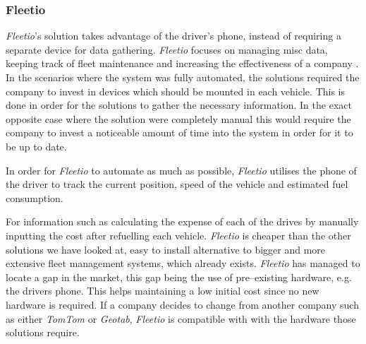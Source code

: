 \subsubsection{Fleetio}
\textit{Fleetio}'s solution takes advantage of the driver's phone, instead of requiring a separate device for data gathering.
\textit{Fleetio} focuses on managing misc data, keeping track of fleet maintenance and increasing the effectiveness of a company \cite{fleetio}.
In the scenarios where the system was fully automated, the solutions required the company to invest in devices which should be mounted in each vehicle.
This is done in order for the solutions to gather the necessary information.
In the exact opposite case where the solution were completely manual this would require the company to invest a noticeable amount of time into the system in order for it to be up to date.

In order for \textit{Fleetio} to automate as much as possible, \textit{Fleetio} utilises the phone of the driver to track the current position, speed of the vehicle and estimated fuel consumption.

For information such as calculating the expense of each of the drives by manually inputting the cost after refuelling each vehicle.
\textit{Fleetio} is cheaper than the other solutions we have looked at, easy to install alternative to bigger and more extensive fleet management systems, which already exists.
\textit{Fleetio} has managed to locate a gap in the market, this gap being the use of pre--existing hardware, e.g. the drivers phone.
This helps maintaining a low initial cost since no new hardware is required.
If a company decides to change from another company such as either \textit{TomTom} or \textit{Geotab}, \textit{Fleetio} is compatible with with the hardware those solutions require.
